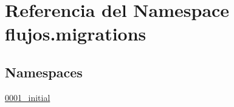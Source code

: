 \hypertarget{namespaceflujos_1_1migrations}{}\section{Referencia del Namespace flujos.\+migrations}
\label{namespaceflujos_1_1migrations}
\subsection*{Namespaces}
\begin{DoxyCompactItemize}
\item 
 \hyperlink{namespaceflujos_1_1migrations_1_10001__initial}{0001\+\_\+initial}
\end{DoxyCompactItemize}
